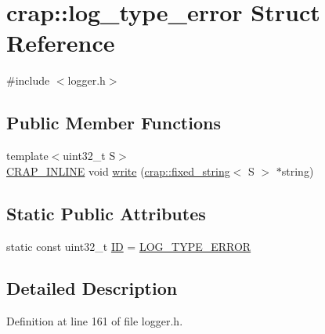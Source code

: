 \hypertarget{structcrap_1_1log__type__error}{\section{crap\+:\+:log\+\_\+type\+\_\+error Struct Reference}
\label{structcrap_1_1log__type__error}
}


{\ttfamily \#include $<$logger.\+h$>$}

\subsection*{Public Member Functions}
\begin{DoxyCompactItemize}
\item 
{\footnotesize template$<$uint32\+\_\+t S$>$ }\\\hyperlink{config__x86_8h_a5a40526b8d842e7ff731509998bb0f1c}{C\+R\+A\+P\+\_\+\+I\+N\+L\+I\+N\+E} void \hyperlink{structcrap_1_1log__type__error_a5753a8d8d91fae170d08ceb5ae54fb2a}{write} (\hyperlink{classcrap_1_1fixed__string}{crap\+::fixed\+\_\+string}$<$ S $>$ $\ast$string)
\end{DoxyCompactItemize}
\subsection*{Static Public Attributes}
\begin{DoxyCompactItemize}
\item 
static const uint32\+\_\+t \hyperlink{structcrap_1_1log__type__error_a3823e5526fc4fc5b1ee65ad9f32d31ee}{I\+D} = \hyperlink{logger_8h_a7c5fd30f5e43b34be24326642d1a4c6d}{L\+O\+G\+\_\+\+T\+Y\+P\+E\+\_\+\+E\+R\+R\+O\+R}
\end{DoxyCompactItemize}


\subsection{Detailed Description}


Definition at line 161 of file logger.\+h.



